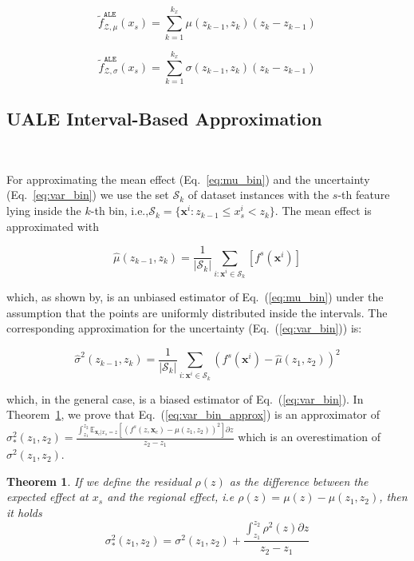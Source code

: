 \documentclass[twoside]{article}
\newtheorem{theorem}{Theorem}[section]
\newcommand{\dfdx}{f^s}
\newcommand{\xc}{\mathbf{x}_c}
\begin{document}
\begin{equation}
  \label{eq:ALE_2}
  \tilde{f}^{\mathtt{ALE}}_{\mathcal{Z}, \mu}(x_s) = \sum_{k=1}^{k_x} \mu(z_{k-1}, z_k) (z_k - z_{k-1})
\end{equation}

\begin{equation}
  \label{eq:ALE_accumulated_var}
  \tilde{f}^{\mathtt{ALE}}_{\mathcal{Z}, \sigma}(x_s) =  \sum_{k=1}^{k_x} \sigma(z_{k-1}, z_k) (z_k - z_{k-1})
\end{equation}
%

\subsection{UALE Interval-Based Approximation}
~\label{sec:UALE-approximation}

For approximating the mean effect (Eq.~\eqref{eq:mu_bin}) and the
uncertainty (Eq.~\eqref{eq:var_bin}) we use the set \(\mathcal{S}_k\)
of dataset instances with the \(s\)-th feature lying inside the
\(k\)-th bin,
i.e.,\( \mathcal{S}_k= \{ \mathbf{x}^i : z_{k-1} \leq x^i_s < z_k \}
\). The mean effect is approximated with

\begin{equation}
  \label{eq:mu_bin_approx}
  \hat{\mu}(z_{k-1}, z_k) = \frac{1}{|\mathcal{S}_k|}
  \sum_{i:\mathbf{x}^i \in \mathcal{S}_k} \left [ \dfdx(\mathbf{x}^i)
  \right ]
\end{equation}

%
which, as shown by\citep{gkolemis22}, is an unbiased estimator of
Eq.~(\ref{eq:mu_bin}) under the assumption that the points are
uniformly distributed inside the intervals. The corresponding
approximation for the uncertainty (Eq.~(\ref{eq:var_bin})) is:

%
\begin{equation}
  \label{eq:var_bin_approx}
  \hat{\sigma}^2(z_{k-1}, z_k) = \frac{1}{|\mathcal{S}_k|}
\sum_{i:\mathbf{x}^i \in \mathcal{S}_k} \left ( \dfdx(\mathbf{x}^i) -
  \hat{\mu}(z_1, z_2) \right )^2
\end{equation}

which, in the general case, is a biased estimator of
Eq.~(\ref{eq:var_bin}). In Theorem~\ref{sec:theorem-1}, we prove that
Eq.~(\ref{eq:var_bin_approx}) is an approximator of
\(\sigma^2_*(z_1, z_2) = \frac{\int_{z_1}^{z_2} \mathbb{E}_{\xc|x_s=z}
  \left [ (f^s(z, \xc) - \mu(z_1, z_2) )^2 \right] \partial z}{z_2 -
  z_1}\) which is an overestimation of \(\sigma^2(z_1, z_2)\).

\begin{theorem}
  \label{sec:theorem-1}
If we define the residual \(\rho(z)\) as the difference
  between the expected effect at \(x_s\) and the regional effect, i.e
  \(\rho(z) = \mu(z) - \mu(z_1, z_2)\), then it holds
\begin{equation}
    \label{eq:bin-uncertainty-proof}
 \sigma_*^2(z_1, z_2) = \sigma^2(z_1, z_2) + \frac{\int_{z_1}^{z_2}\rho^2(z) \partial z}{z_2 - z_1}
\end{equation}
  \end{theorem}
\end{document}
